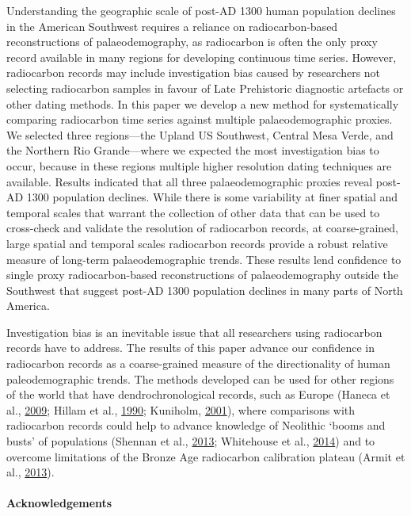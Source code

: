 \documentclass[
]{sa}
\begin{document}
Understanding the geographic scale of post-AD 1300 human population declines in the American Southwest requires a reliance on radiocarbon-based reconstructions of palaeodemography, as radiocarbon is often the only proxy record available in many regions for developing continuous time series. However, radiocarbon records may include investigation bias caused by researchers not selecting radiocarbon samples in favour of Late Prehistoric diagnostic artefacts or other dating methods. In this paper we develop a new method for systematically comparing radiocarbon time series against multiple palaeodemographic proxies. We selected three regions---the Upland US Southwest, Central Mesa Verde, and the Northern Rio Grande---where we expected the most investigation bias to occur, because in these regions multiple higher resolution dating techniques are available. Results indicated that all three palaeodemographic proxies reveal post-AD 1300 population declines. While there is some variability at finer spatial and temporal scales that warrant the collection of other data that can be used to cross-check and validate the resolution of radiocarbon records, at coarse-grained, large spatial and temporal scales radiocarbon records provide a robust relative measure of long-term palaeodemographic trends. These results lend confidence to single proxy radiocarbon-based reconstructions of palaeodemography outside the Southwest that suggest post-AD 1300 population declines in many parts of North America.

Investigation bias is an inevitable issue that all researchers using radiocarbon records have to address. The results of this paper advance our confidence in radiocarbon records as a coarse-grained measure of the directionality of human paleodemographic trends. The methods developed can be used for other regions of the world that have dendrochronological records, such as Europe (Haneca et al., \protect\hyperlink{ref-Haneca2009}{2009}; Hillam et al., \protect\hyperlink{ref-Hillam1990}{1990}; Kuniholm, \protect\hyperlink{ref-Kuniholm2001}{2001}), where comparisons with radiocarbon records could help to advance knowledge of Neolithic `booms and busts' of populations (Shennan et al., \protect\hyperlink{ref-Shennan2013}{2013}; Whitehouse et al., \protect\hyperlink{ref-Whitehouse2014}{2014}) and to overcome limitations of the Bronze Age radiocarbon calibration plateau (Armit et al., \protect\hyperlink{ref-Armit2013}{2013}).

\hypertarget{acknowledgements}{%
\paragraph*{Acknowledgements}\label{acknowledgements}}
\end{document}
